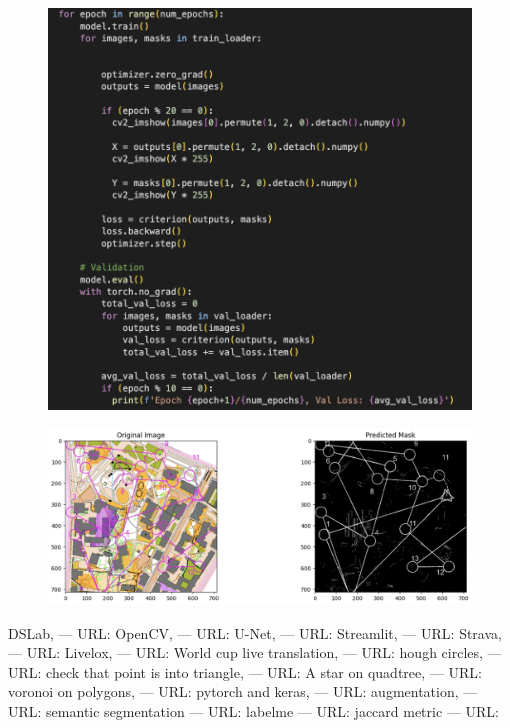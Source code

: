 \documentclass[a4paper,12pt]{extarticle}
\begin{document}
\begin{figure}[H]
    \centering
    \includegraphics[width=\linewidth]{CNN training loop.png}
    \label{fig:training-loop}
\end{figure}

\begin{figure}[H]
    \centering
    \includegraphics[width=\linewidth]{Predicted mask.png}
    \label{fig:predicted-mask}
\end{figure}
  

\newpage



\begin{thebibliography}{00}
 DSLab, --- URL: 
 OpenCV, --- URL: 
 U-Net, --- URL: 
 Streamlit, --- URL: 
 Strava, --- URL: 
 Livelox, --- URL: 
 World cup live translation, --- URL: 
 hough circles, --- URL: 
 check that point is into triangle, --- URL: 
 A star on quadtree, --- URL: 
 voronoi on polygons, --- URL: 
 pytorch and keras, --- URL: 
 augmentation, --- URL: 
 semantic segmentation --- URL: 
 labelme --- URL: 
 jaccard metric --- URL: 

\end{thebibliography}
	
	
\end{document}
